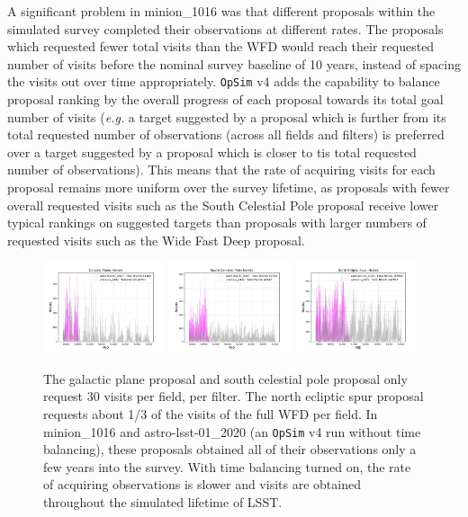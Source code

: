 \documentclass[DM,authoryear,toc]{lsstdoc}
\newcommand{\opsim}{\texttt{OpSim}\xspace}
\begin{document}
A significant problem in minion\_1016 was that different proposals within the simulated survey completed their observations at different rates. The proposals which requested fewer total visits than the WFD would reach their requested number of visits before the nominal survey baseline of 10 years, instead of spacing the visits out over time appropriately. \opsim v4 adds the capability to balance proposal ranking by the overall progress of each proposal towards its total goal number of visits ({\it e.g.} a target suggested by a proposal which is further from its total requested number of observations (across all fields and filters) is preferred over a target suggested by a proposal which is closer to tis total requested number of observations). This means that the rate of acquiring visits for each proposal remains more uniform over the survey lifetime, as proposals with fewer overall requested visits such as the South Celestial Pole proposal receive lower typical rankings on suggested targets than proposals with larger numbers of requested visits such as the Wide Fast Deep proposal.

\begin{figure}[ht]
\centering
\includegraphics[width=0.32\textwidth]{figures/timebalancing_gp}
\includegraphics[width=0.32\textwidth]{figures/timebalancing_scp}
\includegraphics[width=0.32\textwidth]{figures/timebalancing_nes}
\caption{The galactic plane proposal and south celestial pole proposal only request 30 visits per field, per filter. The north ecliptic spur proposal requests about 1/3 of the visits of the full WFD per field. In minion\_1016 and astro-lsst-01\_2020 (an \opsim v4 run without time balancing), these proposals obtained all of their observations only a few years into the survey. With time balancing turned on, the rate of acquiring observations is slower and visits are obtained throughout the simulated lifetime of LSST.
\label{fig:timebalancing}}
\end{figure}
\end{document}
